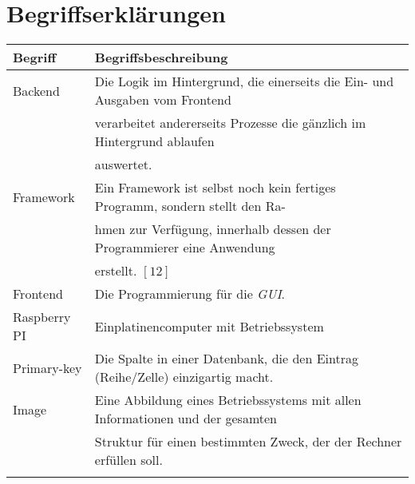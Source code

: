 \section*{Begriffserklärungen}
\begin{table}[H]
    \begin{tabular}{l|l}
         \textbf{Begriff}& \textbf{Begriffsbeschreibung}\\
         \hline
         Backend&               Die Logik im Hintergrund, die einerseits die Ein- und Ausgaben vom Frontend\\
         &                      verarbeitet andererseits Prozesse die gänzlich im Hintergrund ablaufen\\
         &                      auswertet.\\
         Framework&             Ein Framework ist selbst noch kein fertiges Programm, sondern stellt den Ra-\\
        &                       hmen zur Verfügung, innerhalb dessen der Programmierer eine Anwendung\\
        &                       erstellt. $[12]$\\
         Frontend&              Die Programmierung für die \textit{GUI}.\\
         Raspberry PI&          Einplatinencomputer mit Betriebssystem\\
         Primary-key&           Die Spalte in einer Datenbank, die den Eintrag (Reihe/Zelle) einzigartig macht.\\
         Image&                 Eine Abbildung eines Betriebssystems mit allen Informationen und der gesamten\\
         &                      Struktur für einen bestimmten Zweck, der der Rechner erfüllen soll.\\
         & 
    \end{tabular}
    \label{tab:begriffserklaerungen}
\end{table}